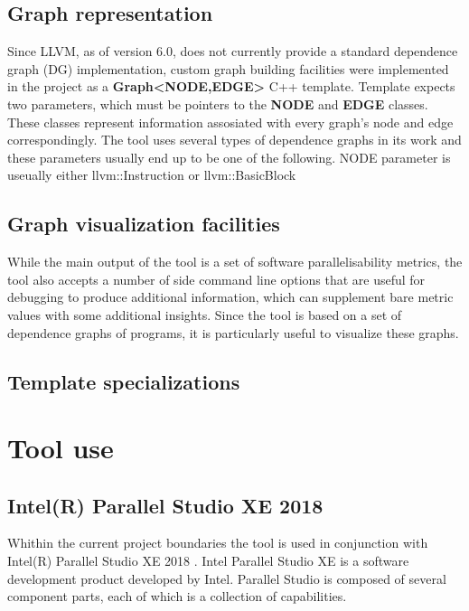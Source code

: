 \subsection{Graph representation} \label{tool-graph-representation}
\qquad Since LLVM, as of version 6.0, does not currently provide a standard dependence graph (DG) implementation, custom graph building facilities were implemented in the project as a \textbf{Graph\textless \textsc{NODE},\textsc{EDGE}\textgreater} C++ template. Template expects two parameters, which must be pointers to the \textbf{NODE} and \textbf{EDGE} classes. These classes represent information assosiated with every graph's node and edge correspondingly. The tool uses several types of dependence graphs in its work and these parameters usually end up to be one of the following. NODE parameter is useually either llvm::Instruction or llvm::BasicBlock   

\subsection{Graph visualization facilities} \label{tool-graph-visualization}
\qquad While the main output of the tool is a set of software parallelisability metrics, the tool also accepts a number of side command line options that are useful for debugging to produce additional information, which can supplement bare metric values with some additional insights. Since the tool is based on a set of dependence graphs of programs, it is particularly useful to visualize these graphs.  

\subsection{Template specializations} \label{tool-template-specs}

\section{Tool use} \label{tool-use}

\subsection{Intel(R) Parallel Studio XE 2018}
\qquad Whithin the current project boundaries the tool is used in conjunction with Intel(R) Parallel Studio XE 2018 \cite{intel-parallel-studio}. Intel Parallel Studio XE is a software development product developed by Intel. Parallel Studio is composed of several component parts, each of which is a collection of capabilities. 


